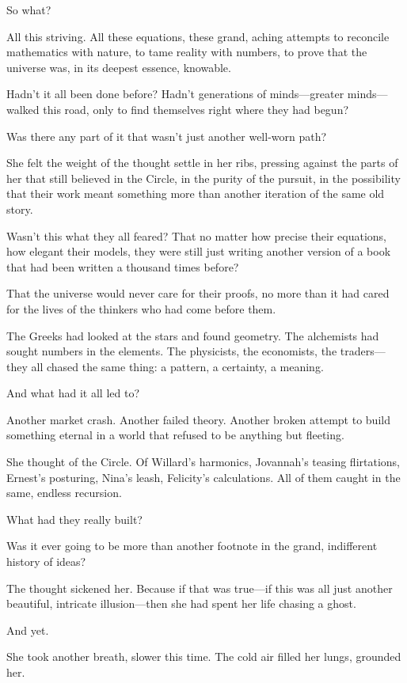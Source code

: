 So what?

All this striving. All these equations, these grand, aching attempts to reconcile mathematics with nature, to tame reality with numbers, to prove that the universe was, in its deepest essence, knowable.

Hadn’t it all been done before? Hadn’t generations of minds—greater minds—walked this road, only to find themselves right where they had begun?

Was there any part of it that wasn’t just another well-worn path?

She felt the weight of the thought settle in her ribs, pressing against the parts of her that still believed in the Circle, in the purity of the pursuit, in the possibility that their work meant something more than another iteration of the same old story.

Wasn’t this what they all feared? That no matter how precise their equations, how elegant their models, they were still just writing another version of a book that had been written a thousand times before?

That the universe would never care for their proofs, no more than it had cared for the lives of the thinkers who had come before them.

The Greeks had looked at the stars and found geometry. The alchemists had sought numbers in the elements. The physicists, the economists, the traders—they all chased the same thing: a pattern, a certainty, a meaning.

And what had it all led to?

Another market crash. Another failed theory. Another broken attempt to build something eternal in a world that refused to be anything but fleeting.

She thought of the Circle. Of Willard’s harmonics, Jovannah’s teasing flirtations, Ernest’s posturing, Nina’s leash, Felicity’s calculations. All of them caught in the same, endless recursion.

What had they really built?

Was it ever going to be more than another footnote in the grand, indifferent history of ideas?

The thought sickened her. Because if that was true—if this was all just another beautiful, intricate illusion—then she had spent her life chasing a ghost.

And yet.

She took another breath, slower this time. The cold air filled her lungs, grounded her.

